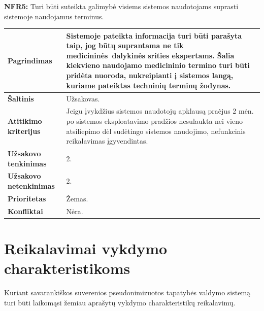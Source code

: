 \documentclass[12pt]{article}
\begin{document}
\noindent \textbf{NFR5:} Turi būti suteikta galimybė visiems sistemos naudotojams
suprasti sistemoje naudojamus terminus.
\label{sec:NFR5}
\begin{table}[htb!]
    \captionsetup{justification=centering}
    \vskip -10pt
    \begin{tabular}{|m{4.9cm}|m{11cm}|}
        \hline
        \raggedleft \textbf{\cellcolor{deepchampagne}Pagrindimas} &
        Sistemoje pateikta informacija turi būti parašyta taip, jog būtų
        suprantama ne tik medicininės dalykinės srities ekspertams. Šalia
        kiekvieno naudojamo medicininio termino turi būti pridėta nuoroda,
        nukreipianti į sistemos langą, kuriame pateiktas techninių terminų
        žodynas. \\
        \hline
        \raggedleft \textbf{\cellcolor{deepchampagne}Šaltinis} & Užsakovas. \\
        \hline
        \raggedleft \textbf{\cellcolor{deepchampagne}Atitikimo kriterijus} & 
        Jeigu įvykdžius sistemos naudotojų apklausą praėjus 2 mėn. po sistemos
        eksploatavimo pradžios nesulaukta nei vieno atsiliepimo dėl sudėtingo
        sistemos naudojimo, nefunkcinis reikalavimas įgyvendintas. \\
        \hline
        \raggedleft \textbf{\cellcolor{deepchampagne}Užsakovo tenkinimas} & 2. \\
        \hline
        \raggedleft \textbf{\cellcolor{deepchampagne}Užsakovo netenkinimas} & 2. \\
        \hline
        \raggedleft \textbf{\cellcolor{deepchampagne}Prioritetas} & Žemas. \\
        \hline
        \raggedleft \textbf{\cellcolor{deepchampagne}Konfliktai} & Nėra. \\
        \hline
    \end{tabular}
\end{table}

\newpage

\section{Reikalavimai vykdymo charakteristikoms}
Kuriant savarankiškos suverenios pseudonimizuotos tapatybės valdymo sistemą
turi būti laikomąsi žemiau aprašytų vykdymo charakteristikų reikalavimų.
\vskip 10pt
\end{document}
